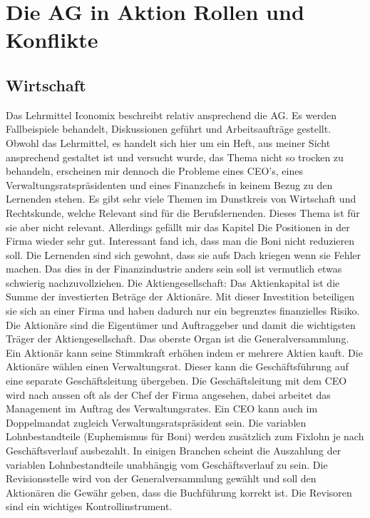 \documentclass[11pt, twocolumn, a4paper]{scrartcl}
\begin{document}
\section{Die AG in Aktion \flqq Rollen und Konflikte\frqq}
\subsection{Wirtschaft}
Das Lehrmittel Iconomix beschreibt relativ ansprechend die AG. Es werden Fallbeispiele behandelt, Diskussionen geführt und Arbeitsaufträge gestellt. Obwohl das Lehrmittel, es handelt sich hier um ein Heft, aus meiner Sicht ansprechend gestaltet ist und versucht wurde, das Thema nicht so trocken zu behandeln, erscheinen mir dennoch die Probleme eines CEO's, eines Verwaltungsratspräsidenten und eines Finanzchefs in keinem Bezug zu den Lernenden stehen. Es gibt sehr viele Themen im Dunstkreis von Wirtschaft und Rechtskunde, welche Relevant sind für die Berufslernenden. Dieses Thema ist für sie aber nicht relevant. Allerdings gefällt mir das Kapitel \flqq Die Positionen in der Firma\frqq{} wieder sehr gut. Interessant fand ich, dass man die Boni nicht reduzieren soll. Die Lernenden sind sich gewohnt, dass sie aufs Dach kriegen wenn sie Fehler machen. Das dies in der Finanzindustrie anders sein soll ist vermutlich etwas schwierig nachzuvollziehen.
Die Aktiengesellschaft: Das Aktienkapital ist die Summe der investierten Beträge der Aktionäre. Mit dieser Investition beteiligen sie sich an einer Firma und haben dadurch nur ein begrenztes finanzielles Risiko. Die Aktionäre sind die Eigentümer und Auftraggeber und damit die wichtigsten Träger der Aktiengesellschaft. Das oberste Organ ist die Generalversammlung. Ein Aktionär kann seine Stimmkraft erhöhen indem er mehrere Aktien kauft. Die Aktionäre wählen einen Verwaltungsrat. Dieser kann die Geschäftsführung auf eine separate Geschäftsleitung übergeben. Die Geschäftsleitung mit dem CEO wird nach aussen oft als der Chef der Firma angesehen, dabei arbeitet das Management im Auftrag des Verwaltungsrates. Ein CEO kann auch im Doppelmandat zugleich Verwaltungsratspräsident sein. Die variablen Lohnbestandteile (Euphemismus für Boni) werden zusätzlich zum Fixlohn je nach Geschäftsverlauf ausbezahlt. In einigen Branchen scheint die Auszahlung der variablen Lohnbestandteile unabhängig vom Geschäftsverlauf zu sein. Die Revisionsstelle wird von der Generalversammlung gewählt und soll den Aktionären die Gewähr geben, dass die Buchführung korrekt ist. Die Revisoren sind ein wichtiges Kontrollinstrument.
\end{document}
